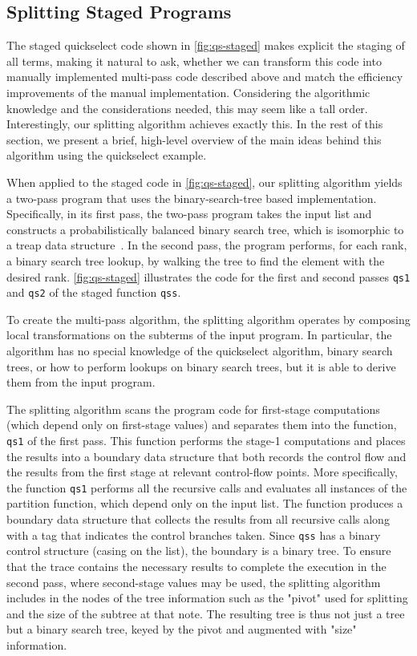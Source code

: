 \begin{abstrsyn}
\subsection{Splitting Staged Programs}



The staged quickselect code shown in \ref{fig:qs-staged} makes
explicit the staging of all terms, making it natural to ask, whether
we can transform this code into manually implemented multi-pass code
described above and match the efficiency improvements of the manual
implementation. Considering the algorithmic knowledge and the
considerations needed, this may seem like a tall order.
Interestingly, our splitting algorithm achieves exactly this.
In the rest of this section, we present a brief, high-level overview
of the main ideas behind this algorithm using the quickselect example.
%

When applied to the staged code in \ref{fig:qs-staged}, our splitting
algorithm yields a two-pass program that uses the binary-search-tree
based implementation.  Specifically, in its first pass, the two-pass
program takes the input list and constructs a probabilistically
balanced binary search tree, which is isomorphic to a treap data
structure~\cite{SeidelAr96}.  In the second pass, the program performs,
for each rank, a binary search tree lookup, by walking the tree to
find the element with the desired rank.
%
\ref{fig:qs-staged} illustrates the code for the first and second
passes \texttt{qs1} and \texttt{qs2} of the staged function
\texttt{qss}.


To create the multi-pass algorithm, the splitting algorithm operates
by composing local transformations on the subterms of the input
program.  In particular, the algorithm has no special knowledge of the
quickselect algorithm, binary search trees, or how to perform lookups
on binary search trees, but it is able to derive them from the input
program.
%

The splitting algorithm scans the program code for first-stage
computations (which depend only on first-stage values) and separates
them into the function, \texttt{qs1} of the first pass. This function
performs the stage-1 computations and places the results into a
boundary data structure that both records the control flow and the
results from the first stage at relevant control-flow points.  More
specifically, the function \texttt{qs1} performs all the recursive
calls and evaluates all instances of the partition function, which
depend only on the input list.  The function produces a boundary data
structure that collects the results from all recursive calls along
with a tag that indicates the control branches taken.  Since
\texttt{qss} has a binary control structure (casing on the list), the
boundary is a binary tree.  To ensure that the trace contains the
necessary results to complete the execution in the second pass, where
second-stage values may be used, the splitting algorithm includes in
the nodes of the tree information such as the "pivot" used for
splitting and the size of the subtree at that note.  The resulting
tree is thus not just a tree but a binary search tree, keyed by the
pivot and augmented with "size" information.


\end{abstrsyn}
